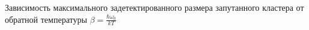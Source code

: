 Зависимость максимального задетектированного размера запутанного кластера от обратной температуры
$\beta = \frac{\hbar\omega_0}{kT} $